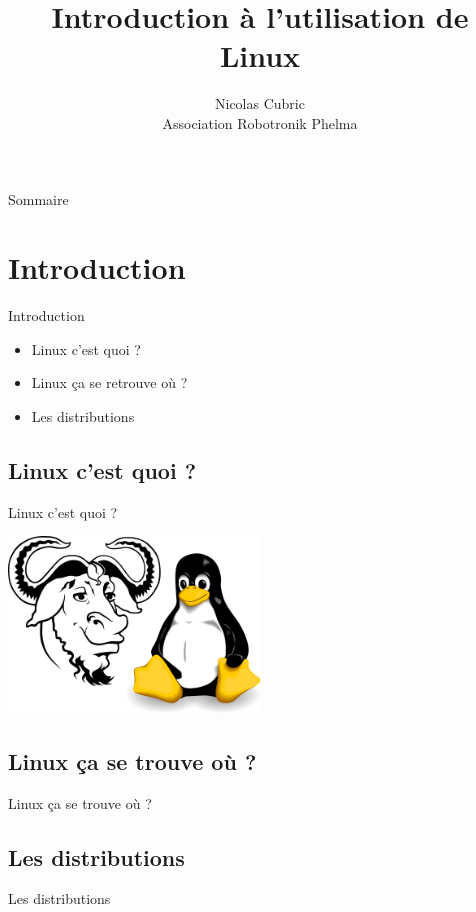 \documentclass{beamer}
\title{Introduction à l'utilisation de Linux}
\author{Nicolas Cubric\\Association Robotronik Phelma}
\date{}
\institute{Grenoble INP Phelma}
\begin{document}
\maketitle

\begin{frame}{Sommaire}
	\tableofcontents
\end{frame}

\section{Introduction}
\begin{frame}{Introduction}
	\begin{itemize}
		\item Linux c'est quoi ?
		\item Linux ça se retrouve où ?
		\item Les distributions
	\end{itemize}
\end{frame}

\subsection{Linux c'est quoi ?}
\begin{frame}{Linux c'est quoi ?}
	\begin{center}
		\includegraphics[width=0.5\textwidth]{Images/GNU_TUX.png}
	\end{center}
\end{frame}

\subsection{Linux ça se trouve où ?}
\begin{frame}{Linux ça se trouve où ?}
\end{frame}

\subsection{Les distributions}
\begin{frame}{Les distributions}
\end{frame}
\end{document}
